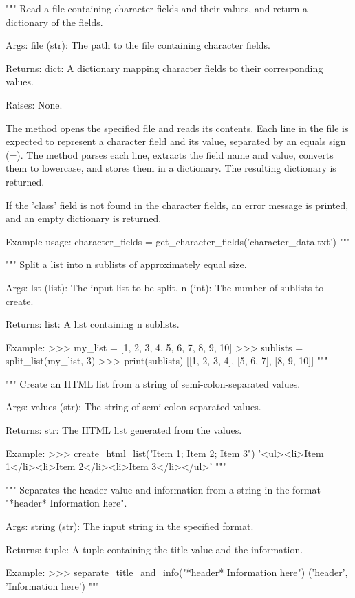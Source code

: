 \begin{codebox}
"""
Read a file containing character fields and their values, and return a dictionary of the fields.

Args:
    file (str): The path to the file containing character fields.

Returns:
    dict: A dictionary mapping character fields to their corresponding values.

Raises:
    None.

The method opens the specified file and reads its contents. Each line in the file is expected to
represent a character field and its value, separated by an equals sign (=). The method parses each
line, extracts the field name and value, converts them to lowercase, and stores them in a dictionary.
The resulting dictionary is returned.

If the 'class' field is not found in the character fields, an error message is printed, and an
empty dictionary is returned.

Example usage:
    character_fields = get_character_fields('character_data.txt')
"""
\end{codebox}

\begin{codebox}
"""
Split a list into n sublists of approximately equal size.

Args:
    lst (list): The input list to be split.
    n (int): The number of sublists to create.

Returns:
    list: A list containing n sublists.

Example:
    >>> my_list = [1, 2, 3, 4, 5, 6, 7, 8, 9, 10]
    >>> sublists = split_list(my_list, 3)
    >>> print(sublists)
    [[1, 2, 3, 4], [5, 6, 7], [8, 9, 10]]
"""
\end{codebox}

\begin{codebox}
"""
Create an HTML list from a string of semi-colon-separated values.

Args:
    values (str): The string of semi-colon-separated values.

Returns:
    str: The HTML list generated from the values.

Example:
    >>> create_html_list("Item 1; Item 2; Item 3")
    '<ul>\n<li>Item 1</li>\n<li>Item 2</li>\n<li>Item 3</li>\n</ul>'
"""
\end{codebox}

\begin{codebox}
"""
Separates the header value and information from a string in the format "*header* Information here".

Args:
    string (str): The input string in the specified format.

Returns:
    tuple: A tuple containing the title value and the information.

Example:
    >>> separate_title_and_info("*header* Information here")
    ('header', 'Information here')
"""
\end{codebox}

